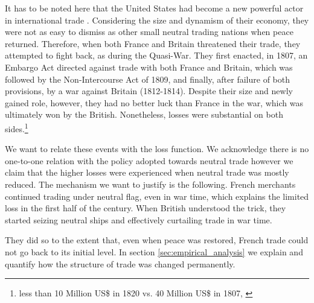 \documentclass[12pt,a4paper,notitlepage,english]{article}
\begin{document}
It has to be noted here that the United States had become a new powerful actor in international trade \citep{Cuenca-Esteban2014}. Considering the size and dynamism of their economy, they were not as easy to dismiss as other small neutral trading nations when peace returned.
Therefore, when both France and Britain threatened their trade, they attempted to fight back, as during the Quasi-War.
They first enacted, in 1807, an Embargo Act directed against trade with both France and Britain, which was followed by the Non-Intercourse Act of 1809, and finally, after failure of both provisions, by a war against Britain (1812-1814). 
Despite their size and newly gained role, however, they had no better luck than France in the war, which was ultimately won by the British.
Nonetheless, losses were substantial on both sides.\footnote{less than 10 Million US\$ in 1820 vs. 40 Million US\$ in 1807, \citep[tables A-4 and B-2]{North1960}}

We want to relate these events with the loss function. We acknowledge there is no one-to-one relation with the policy adopted towards neutral trade however we claim that the higher losses were experienced when neutral trade was mostly reduced. The mechanism we want to justify is the following. French merchants continued trading under neutral flag, even in war time, which explains the limited loss in the first half of the century. When British understood the trick, they started seizing neutral ships and effectively curtailing trade in war time.

They did so to the extent that, even when peace was restored, French trade could not go back to its initial level. In section \ref{sec:empirical_analysis} we explain and quantify how the structure of trade was changed permanently.  



 
\end{document}
